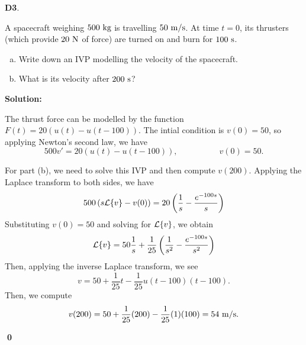 \documentclass{article}
\newenvironment{problem}[1]
{
  \begin{flushleft}
  \textbf{#1}.
  \ignorespaces
}
{
  \end{flushleft}
}
\newenvironment{solution}
{
  \ignorespaces
  \textbf{Solution:}
}
{
  \ignorespacesafterend
  \begin{flushright}
  {\bfseries \qed}
  \end{flushright}
}
\begin{document}
\begin{problem}{D3}
A spacecraft weighing \(500\ {\rm kg}\) is travelling \(50\ {\rm m/s}\).  At time \(t=0\), its thrusters (which provide \(20\ {\rm N}\) of force) are turned on and burn for \(100\ {\rm s}\).  
\begin{enumerate}[(a)]
\item Write down an IVP modelling the velocity of the spacecraft.
\item What is its velocity after \(200\ {\rm s}\)?
\end{enumerate}
\end{problem}
\begin{solution}
The thrust force can be modelled by the function \(F(t)= 20 \left( u(t)-u(t-100)\right)\).  The intial condition is \(v(0)=50\), so applying Newton's second law, we have
\[ 500v' = 20 \left( u(t)-u(t-100)\right), \hspace{5em} v(0)=50.\]

For part (b), we need to solve this IVP and then compute \(v(200)\).  Applying the Laplace transform to both sides, we have
\[ 500 \left( s\mathcal{L}\{v\}- v(0) \right) = 20 \left( \frac{1}{s} - \frac{ e^{-100s}}{s} \right) \]
Substituting \(v(0)=50\) and solving for \(\mathcal{L}\{v\}\), we obtain
\[\mathcal{L}\{v\} = 50\frac{1}{s} + \frac{1}{25} \left( \frac{1}{s^2} - \frac{e^{-100s}}{s^2} \right)\]
Then, applying the inverse Laplace transform, we see
\[v=50+\frac{1}{25}t-\frac{1}{25} u(t-100)(t-100).\]
Then, we compute \[v(200)=50+\frac{1}{25}(200)- \frac{1}{25}(1)(100) = 54\ {\rm m/s}.\]
\end{solution}
\end{document}
